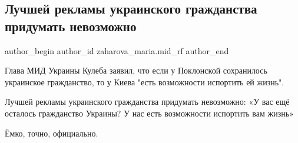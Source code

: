  
 
 
 
 
 
\subsection{Лучшей рекламы украинского гражданства придумать невозможно}
\label{sec:28_08_2021.fb.zaharova_maria.mid_rf.1.ukr_grazhdanstvo_kuleba}
 
\ifcmt
 author_begin
   author_id zaharova_maria.mid_rf
 author_end
\fi


Глава МИД Украины Кулеба заявил, что если у Поклонской сохранилось украинское
гражданство, то у Киева "есть возможности испортить ей жизнь".

Лучшей рекламы украинского гражданства придумать невозможно: «У вас ещё
осталось гражданство Украины? У нас есть возможности испортить вам жизнь»

Ёмко, точно, официально.
